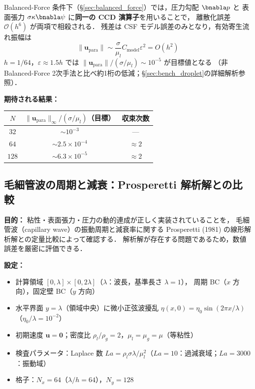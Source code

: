 \begin{tcolorbox}[resultbox, title={寄生流れ振幅の理論的予測（Balanced-Force 条件下）}]
Balanced-Force 条件下（§\ref{sec:balanced_force}）では，圧力勾配 $\bnabla p$ と
表面張力 $\sigma\kappa\bnabla\psi$ に\textbf{同一の CCD 演算子}を用いることで，
離散化誤差 $\mathcal{O}(h^6)$ が両項で相殺される．
残差は CSF モデル誤差のみとなり，有効寄生流れ振幅は
\[
  \|\bm{u}_{\mathrm{para}}\| \sim \frac{\sigma}{\mu_l} C_{\mathrm{model}} \varepsilon^2 = O(h^2)
\]
$h = 1/64$，$\varepsilon \approx 1.5h$ では $\|\bm{u}_{\mathrm{para}}\|/(\sigma/\mu_l) \sim 10^{-5}$ が目標値となる
（非 Balanced-Force 2次手法と比べ約1桁の低減；§\ref{sec:bench_droplet}の詳細解析参照）．
\end{tcolorbox}

\textbf{期待される結果：}
\begin{center}
\renewcommand{\arraystretch}{1.3}
\begin{tabular}{ccc}
\toprule
$N$ & $\|\bm{u}_{\mathrm{para}}\|_\infty / (\sigma/\mu_l)$（目標） & 収束次数 \\
\midrule
$32$  & $\sim 10^{-3}$ & --- \\
$64$  & $\sim 2.5\times10^{-4}$ & $\approx 2$ \\
$128$ & $\sim 6.3\times10^{-5}$ & $\approx 2$ \\
\bottomrule
\end{tabular}
\end{center}

\subsection{毛細管波の周期と減衰：Prosperetti 解析解との比較}
\label{sec:val_capwave}

\textbf{目的：}
粘性・表面張力・圧力の動的連成が正しく実装されていることを，
毛細管波（capillary wave）の振動周期と減衰率に関する
Prosperetti (1981) \cite{Prosperetti1981} の線形解析解との定量比較によって確認する．
解析解が存在する問題であるため，数値誤差を厳密に評価できる．

\textbf{設定：}
\begin{itemize}
  \item 計算領域 $[0, \lambda] \times [0, 2\lambda]$（$\lambda$：波長，基準長さ $\lambda = 1$），
        周期 BC（$x$ 方向），固定壁 BC（$y$ 方向）
  \item 水平界面 $y = \lambda$（領域中央）に微小正弦波擾乱
        $\eta(x,0) = \eta_0 \sin(2\pi x / \lambda)$（$\eta_0/\lambda = 10^{-2}$）
  \item 初期速度 $\bm{u} = \bm{0}$；密度比 $\rho_l/\rho_g = 2$，$\mu_l = \mu_g = \mu$（等粘性）
  \item 検査パラメータ：Laplace 数 $La = \rho_l \sigma \lambda / \mu_l^2$（$La = 10$：過減衰域；$La = 3000$：振動域）
  \item 格子：$N_x = 64$（$\lambda / h = 64$），$N_y = 128$
\end{itemize}

